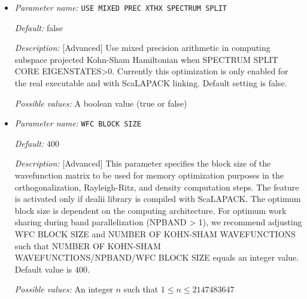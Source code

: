 \begin{itemize}
{\it Possible values:} A boolean value (true or false)
\item {\it Parameter name:} {\tt USE MIXED PREC XTHX SPECTRUM SPLIT}
\label{parameters:SCF parameters/Eigen_2dsolver parameters/USE MIXED PREC XTHX SPECTRUM SPLIT}
\label{parameters:SCF_20parameters/Eigen_2dsolver_20parameters/USE_20MIXED_20PREC_20XTHX_20SPECTRUM_20SPLIT}




{\it Default:} false


{\it Description:} [Advanced] Use mixed precision arithmetic in computing subspace projected Kohn-Sham Hamiltonian when SPECTRUM SPLIT CORE EIGENSTATES>0. Currently this optimization is only enabled for the real executable and with ScaLAPACK linking. Default setting is false.


{\it Possible values:} A boolean value (true or false)
\item {\it Parameter name:} {\tt WFC BLOCK SIZE}
\label{parameters:SCF parameters/Eigen_2dsolver parameters/WFC BLOCK SIZE}
\label{parameters:SCF_20parameters/Eigen_2dsolver_20parameters/WFC_20BLOCK_20SIZE}




{\it Default:} 400


{\it Description:} [Advanced]  This parameter specifies the block size of the wavefunction matrix to be used for memory optimization purposes in the orthogonalization, Rayleigh-Ritz, and density computation steps. The feature is activated only if dealii library is compiled with ScaLAPACK. The optimum block size is dependent on the computing architecture. For optimum work sharing during band parallelization (NPBAND > 1), we recommend adjusting WFC BLOCK SIZE and NUMBER OF KOHN-SHAM WAVEFUNCTIONS such that NUMBER OF KOHN-SHAM WAVEFUNCTIONS/NPBAND/WFC BLOCK SIZE equals an integer value. Default value is 400.


{\it Possible values:} An integer $n$ such that $1\leq n \leq 2147483647$
\end{itemize}
